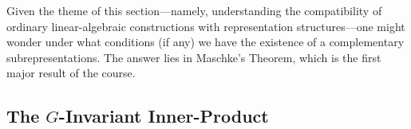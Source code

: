 Given the theme of this section---namely, understanding the compatibility of ordinary linear-algebraic constructions with representation structures---one might wonder under what conditions (if any) we have the existence of a complementary subrepresentations. The answer lies in Maschke's Theorem, which is the first major result of the course.

\subsection{The $G$-Invariant Inner-Product}

